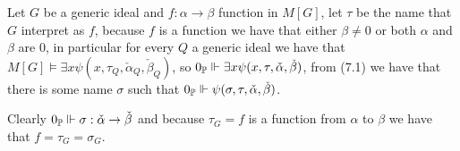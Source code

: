 Let $G$ be a generic ideal and $f:\alpha\to\beta$ function in $M[G]$, let $\tau$ be the name that $G$ interpret as $f$, because $f$ is a function we have that either $\beta\ne 0$ or both $\alpha$ and $\beta$ are $0$, in particular for every $Q$ a generic ideal we have that $M[G]\models\exists x\psi(x,\tau_Q,\check{\alpha}_Q,\check{\beta}_Q)$, so $0_\Bbb P\Vdash \exists x\psi(x,\tau,\check{\alpha},\check{\beta})$, from (7.1) we have that there is some name $\sigma$ such that $0_\Bbb P\Vdash \psi(\sigma,\tau,\check{\alpha},\check{\beta})$.

Clearly $0_\Bbb P\Vdash \sigma:\check{\alpha}\to\check{\beta}$ and because $\tau_G=f$ is a function from $\alpha$ to $\beta$ we have that $f=\tau_G=\sigma_G$.





